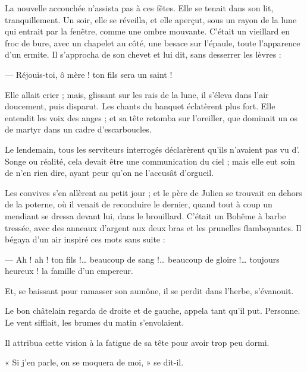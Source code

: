 \documentclass[]{book}
\begin{document}
                La nouvelle accouchée n'assista pas à ces fêtes. Elle se tenait dans son lit, tranquillement. Un soir, elle se réveilla, et elle aperçut, sous un rayon de la lune qui entrait par la fenêtre, comme une ombre mouvante. C'était un vieillard en froc de bure, avec un chapelet au côté, une besace sur l'épaule, toute l'apparence d'un ermite. Il s'approcha de son chevet et lui dit, sans desserrer les lèvres :
                    
                — Réjouis-toi, ô mère ! ton fils sera un saint !
                    
                Elle allait crier ; mais, glissant sur les rais de la lune, il s'éleva dans l'air doucement, puis disparut. Les chants du banquet éclatèrent plus fort. Elle entendit les voix des anges ; et sa tête retomba sur l'oreiller, que dominait un os de martyr dans un cadre d'escarboucles.
                    
                Le lendemain, tous les serviteurs interrogés déclarèrent qu'ils n'avaient pas vu d'. Songe ou réalité, cela devait être une communication du ciel ; mais elle eut soin de n'en rien dire, ayant peur qu'on ne l'accusât d'orgueil.
                    
                Les convives s'en allèrent au petit jour ; et le père de Julien se trouvait en dehors de la poterne, où il venait de reconduire le dernier, quand tout à coup un mendiant se dressa devant lui, dans le brouillard. C'était un Bohême à barbe tressée, avec des anneaux d'argent aux deux bras et les prunelles flamboyantes. Il bégaya d'un air inspiré ces mots sans suite :
                    
                — Ah ! ah ! ton fils !… beaucoup de sang !… beaucoup de gloire !… toujours heureux ! la famille d'un empereur.
                    
                Et, se baissant pour ramasser son aumône, il se perdit dans l'herbe, s'évanouit.
                    
                Le bon châtelain regarda de droite et de gauche, appela tant qu'il put. Personne. Le vent sifflait, les brumes du matin s'envolaient.
                    
                Il attribua cette vision à la fatigue de sa tête pour avoir trop peu dormi.
                    
                « Si j'en parle, on se moquera de moi, » se dit-il.
                    
\end{document}
